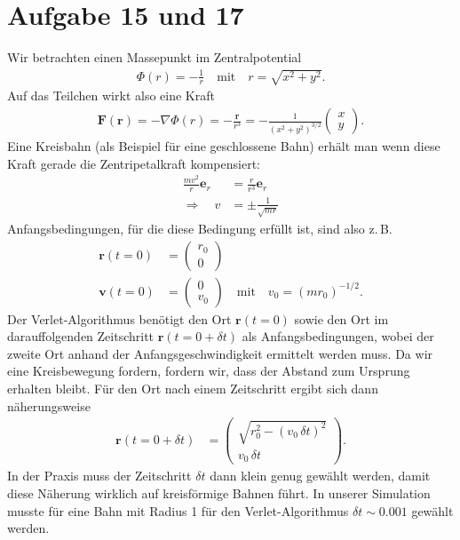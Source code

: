 \documentclass[a4paper,11pt]{scrartcl}
\renewcommand{\vec}[1]{\mathbf{#1}}
\newcommand*{\zB}{z.\,B.\xspace }
\begin{document}
\section*{Aufgabe 15 und 17} %
\label{sec:aufgabe_15}
Wir betrachten einen Massepunkt im Zentralpotential \begin{align}
	\Phi(r) = - \frac{1}{r} \quad\text{mit}\quad r = \sqrt{x^2+y^2} .
\end{align}
Auf das Teilchen wirkt also eine Kraft \begin{align}
	\vec{F}(\vec{r}) = -\nabla \Phi(r) = - \frac{\vec{r}}{r^3} = - \frac{1}{(x^2+y^2)^{3/2}} \left(
	\begin{array}{c}
	x
	\\ y\end{array} \right) .
\end{align}
Eine Kreisbahn (als Beispiel für eine geschlossene Bahn) erhält man wenn diese Kraft gerade die Zentripetalkraft kompensiert: \begin{align}
	\frac{m v^2}{r} \vec{e}_r &= \frac{r}{r^3} \vec{e}_r\\
	\Rightarrow\quad v &= \pm \frac{1}{\sqrt{m r}} 
\end{align}
Anfangsbedingungen, für die diese Bedingung erfüllt ist, sind also \zB \begin{align}
	\vec{r}(t=0) &= \left(
	\begin{array}{c}
	r_0\\ 
	0\end{array} \right)\\
	\vec{v}(t=0) &= \left(
	\begin{array}{c}
	0\\ 
	v_0 \end{array} \right) \quad\text{mit}\quad v_0 = (m r_0)^{-1/2}.
\end{align}
Der Verlet-Algorithmus benötigt den Ort $\vec{r}(t=0)$ sowie den Ort im darauffolgenden Zeitschritt $\vec{r}(t=0+\delta t)$ als Anfangsbedingungen, wobei der zweite Ort anhand der Anfangsgeschwindigkeit ermittelt werden muss. Da wir eine Kreisbewegung fordern, fordern wir, dass der Abstand zum Ursprung erhalten bleibt. Für den Ort nach einem Zeitschritt ergibt sich dann näherungsweise \begin{align}
	\vec{r}(t=0+\delta t) &= \left(
	\begin{array}{c}
	\sqrt{r_0^2 - (v_0\,\delta t)^2 } \\ 
	v_0\,\delta t \end{array} \right).
\end{align}
In der Praxis muss der Zeitschritt $\delta t$ dann klein genug gewählt werden, damit diese Näherung wirklich auf kreisförmige Bahnen führt. In unserer Simulation musste für eine Bahn mit Radius 1 für den Verlet-Algorithmus $\delta t \sim 0.001$ gewählt werden.
\end{document}
